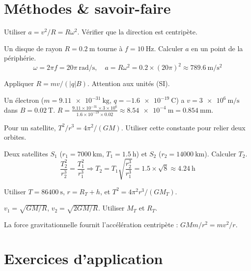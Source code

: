 \section{Méthodes \& savoir-faire}

Utiliser $a = v^2/R = R\omega^2$. Vérifier que la direction est centripète.

\begin{exemple}
Un disque de rayon $R=\SI{0.2}{\metre}$ tourne à $f=\SI{10}{\hertz}$. Calculer $a$ en un point de la périphérie.
\[
\omega = 2\pi f = 20\pi\ \si{\radian\per\second},\quad a = R\omega^2 = 0.2\times(20\pi)^2 \approx \SI{789.6}{\metre\per\second\squared}
\]
\end{exemple}

Appliquer $R = mv/(|q|B)$. Attention aux unités (SI).

\begin{exemple}
Un électron ($m=\SI{9.11e-31}{\kilogram}$, $q=\SI{-1.6e-19}{\coulomb}$) a $v=\SI{3e6}{\metre\per\second}$ dans $B=\SI{0.02}{\tesla}$. $R = \frac{9.11\times10^{-31}\times3\times10^{6}}{1.6\times10^{-19}\times0.02} \approx \SI{8.54e-4}{\metre} = \SI{0.854}{\milli\metre}$.
\end{exemple}

Pour un satellite, $T^2/r^3 = 4\pi^2/(GM)$. Utiliser cette constante pour relier deux orbites.

\begin{exemple}
Deux satellites $S_1$ ($r_1=\SI{7000}{\kilo\metre}$, $T_1=\SI{1.5}{\hour}$) et $S_2$ ($r_2=\SI{14000}{\kilo\metre}$). Calculer $T_2$.
\[
\frac{T_2^2}{r_2^3} = \frac{T_1^2}{r_1^3} \Rightarrow T_2 = T_1\sqrt{\frac{r_2^3}{r_1^3}} = 1.5\times\sqrt{8} \approx \SI{4.24}{\hour}
\]
\end{exemple}

Utiliser $T = \SI{86400}{\second}$, $r = R_T + h$, et $T^2 = 4\pi^2 r^3/(GM_T)$.

$v_1 = \sqrt{GM/R}$, $v_2 = \sqrt{2GM/R}$. Utiliser $M_T$ et $R_T$.

La force gravitationnelle fournit l'accélération centripète : $GMm/r^2 = mv^2/r$.

\section{Exercices d'application}

